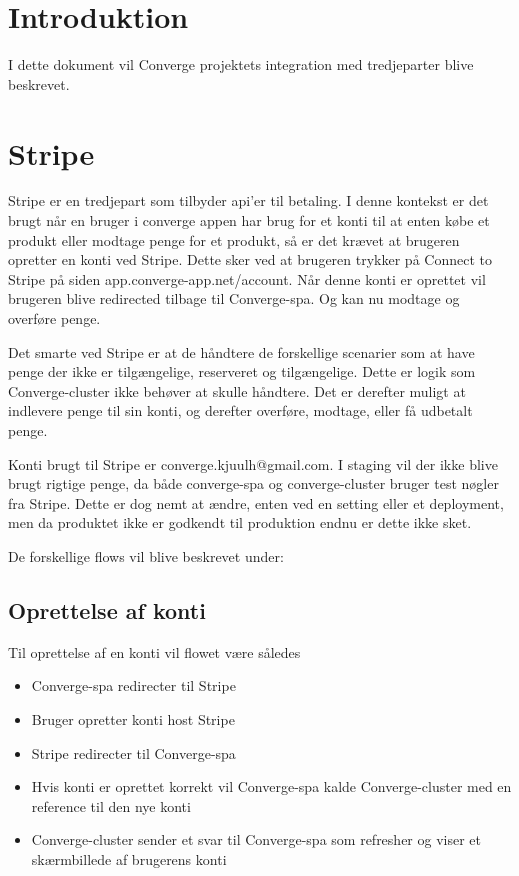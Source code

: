 \chapter{Introduktion}

I dette dokument vil Converge projektets integration med tredjeparter blive beskrevet.

\chapter{Stripe}

Stripe er en tredjepart som tilbyder api'er til betaling. I denne kontekst er det brugt når en bruger i converge appen har brug for et konti til at enten købe et produkt eller modtage penge for et produkt, så er det krævet at brugeren opretter en konti ved Stripe. Dette sker ved at brugeren trykker på Connect to Stripe på siden app.converge-app.net/account. Når denne konti er oprettet vil brugeren blive redirected tilbage til Converge-spa. Og kan nu modtage og overføre penge.

Det smarte ved Stripe er at de håndtere de forskellige scenarier som at have penge der ikke er tilgængelige, reserveret og tilgængelige. Dette er logik som Converge-cluster ikke behøver at skulle håndtere. Det er derefter muligt at indlevere penge til sin konti, og derefter overføre, modtage, eller få udbetalt penge.

Konti brugt til Stripe er converge.kjuulh@gmail.com. I staging vil der ikke blive brugt rigtige penge, da både converge-spa og converge-cluster bruger test nøgler fra Stripe. Dette er dog nemt at ændre, enten ved en setting eller et deployment, men da produktet ikke er godkendt til produktion endnu er dette ikke sket.

De forskellige flows vil blive beskrevet under:

\section{Oprettelse af konti}

Til oprettelse af en konti vil flowet være således

\begin{itemize}
    \item Converge-spa redirecter til Stripe
    \item Bruger opretter konti host Stripe
    \item Stripe redirecter til Converge-spa
    \item Hvis konti er oprettet korrekt vil Converge-spa kalde Converge-cluster med en reference til den nye konti
    \item Converge-cluster sender et svar til Converge-spa som refresher og viser et skærmbillede af brugerens konti
\end{itemize}

